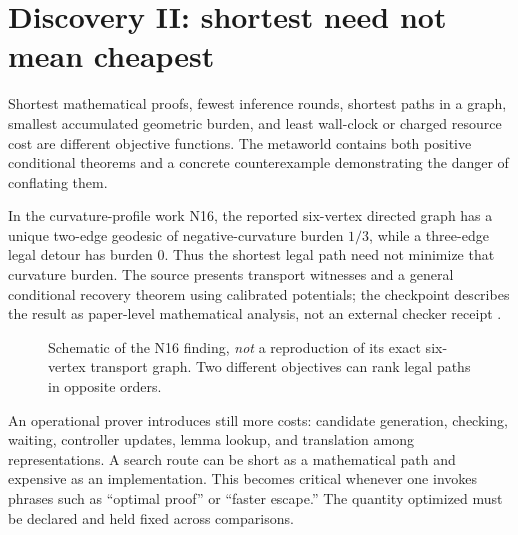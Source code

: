\documentclass[11pt,letterpaper,oneside]{article}
\begin{document}
\section{Discovery II: shortest need not mean cheapest}
Shortest mathematical proofs, fewest inference rounds, shortest paths in a graph, smallest accumulated geometric burden, and least wall-clock or charged resource cost are different objective functions. The metaworld contains both positive conditional theorems and a concrete counterexample demonstrating the danger of conflating them.

In the curvature-profile work N16, the reported six-vertex directed graph has a unique two-edge geodesic of negative-curvature burden $1/3$, while a three-edge legal detour has burden $0$. Thus the shortest legal path need not minimize that curvature burden. The source presents transport witnesses and a general conditional recovery theorem using calibrated potentials; the checkpoint describes the result as paper-level mathematical analysis, not an external checker receipt \cite{checkpoint}.

\begin{figure}[ht]
\centering
{}
\caption{Schematic of the N16 finding, \emph{not} a reproduction of its exact six-vertex transport graph. Two different objectives can rank legal paths in opposite orders.}
\end{figure}

An operational prover introduces still more costs: candidate generation, checking, waiting, controller updates, lemma lookup, and translation among representations. A search route can be short as a mathematical path and expensive as an implementation. This becomes critical whenever one invokes phrases such as ``optimal proof'' or ``faster escape.'' The quantity optimized must be declared and held fixed across comparisons.
\end{document}
